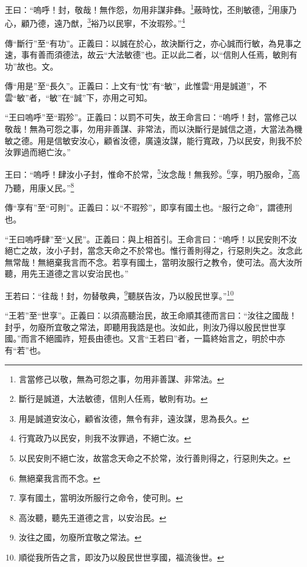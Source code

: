 王曰：“嗚呼！封，敬哉！無作怨，勿用非謀非彝。\footnote{言當修己以敬，無為可怨之事，勿用非善謀、非常法。}蔽時忱，丕則敏德，\footnote{斷行是誠道，大法敏德，信則人任焉，敏則有功。}用康乃心，顧乃德，遠乃猷，\footnote{用是誠道安汝心，顧省汝德，無令有非，遠汝謀，思為長久。}裕乃以民寧，不汝瑕殄。”\footnote{行寬政乃以民安，則我不汝罪過，不絕亡汝。}


{\noindent\zhuan{}\fzbyks 傳“斷行”至“有功”。正義曰：以誠在於心，故決斷行之，亦心誠而行敏，為見事之速，事有善而須德法，故云“大法敏德”也。正以此二者，以“信則人任焉，敏則有功”故也。文。 \par}

{\noindent\zhuan{}\fzbyks 傳“用是”至“長久”。正義曰：上文有“忱”有“敏”，此惟雲“用是誠道”，不雲“敏”者，“敏”在“誠”下，亦用之可知。 \par}

{\noindent\shu{}\fzkt “王曰嗚呼”至“瑕殄”。正義曰：以罰不可失，故王命言曰：“嗚呼！封，當修己以敬哉！無為可怨之事，勿用非善謀、非常法，而以決斷行是誠信之道，大當法為機敏之德。用是信敏安汝心，顧省汝德，廣遠汝謀，能行寬政，乃以民安，則我不於汝罪過而絕亡汝。” \par}

王曰：“嗚呼！肆汝小子封，惟命不於常，\footnote{以民安則不絕亡汝，故當念天命之不於常，汝行善則得之，行惡則失之。}汝念哉！無我殄。\footnote{無絕棄我言而不念。}享，明乃服命，\footnote{享有國土，當明汝所服行之命令，使可則。}高乃聽，用康乂民。”\footnote{高汝聽，聽先王道德之言，以安治民。}


{\noindent\zhuan{}\fzbyks 傳“享有”至“可則”。正義曰：以“不瑕殄”，即享有國土也。“服行之命”，謂德刑也。 \par}

{\noindent\shu{}\fzkt “王曰嗚呼肆”至“乂民”。正義曰：與上相首引。王命言曰：“嗚呼！以民安則不汝絕亡之故，汝小子封，當念天命之不於常也。惟行善則得之，行惡則失之。汝念此無常哉！無絕棄我言而不念。若享有國土，當明汝服行之教令，使可法。高大汝所聽，用先王道德之言以安治民也。” \par}

王若曰：“往哉！封，勿替敬典，\footnote{汝往之國，勿廢所宜敬之常法。}聽朕告汝，乃以殷民世享。”\footnote{順從我所告之言，即汝乃以殷民世世享國，福流後世。}

{\noindent\shu{}\fzkt “王若”至“世享”。正義曰：以須高聽治民，故王命順其德而言曰：“汝往之國哉！封乎，勿廢所宜敬之常法，即聽用我誥是也。汝如此，則汝乃得以殷民世世享國。”而言不絕國祚，短長由德也。又言“王若曰”者，一篇終始言之，明於中亦有“若”也。 \par}

